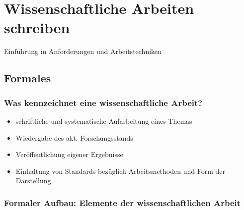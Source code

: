

\section{Wissenschaftliche Arbeiten
schreiben}\label{wissenschaftliche-arbeiten-schreiben}

Einführung in Anforderungen und Arbeitstechniken

\subsection{Formales}\label{formales}

\subsubsection{Was kennzeichnet eine wissenschaftliche
Arbeit?}\label{was-kennzeichnet-eine-wissenschaftliche-arbeit}

\begin{itemize}%
\item
  schriftliche und systematische Aufarbeitung eines Themas
\item
  Wiedergabe des akt. Forschungsstands
\item
  Veröffentlichung eigener Ergebnisse
\item
  Einhaltung von Standards bezüglich Arbeitsmethoden und Form der
  Darstellung
\end{itemize}

\subsubsection{Formaler Aufbau: Elemente der wissenschaftlichen
Arbeit}\label{formaler-aufbau-elemente-der-wissenschaftlichen-arbeit}

